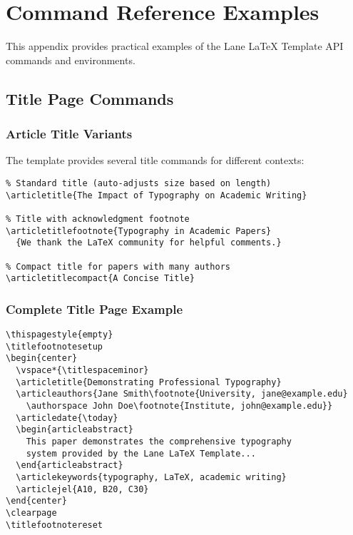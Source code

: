 
\section{Command Reference Examples}
\label{app:api-examples}

This appendix provides practical examples of the Lane LaTeX Template API commands and environments.

\subsection{Title Page Commands}

\subsubsection{Article Title Variants}

The template provides several title commands for different contexts:

\begin{verbatim}
% Standard title (auto-adjusts size based on length)
\articletitle{The Impact of Typography on Academic Writing}

% Title with acknowledgment footnote
\articletitlefootnote{Typography in Academic Papers}
  {We thank the LaTeX community for helpful comments.}

% Compact title for papers with many authors
\articletitlecompact{A Concise Title}
\end{verbatim}

\subsubsection{Complete Title Page Example}

\begin{verbatim}
\thispagestyle{empty}
\titlefootnotesetup
\begin{center}
  \vspace*{\titlespaceminor}
  \articletitle{Demonstrating Professional Typography}
  \articleauthors{Jane Smith\footnote{University, jane@example.edu}
    \authorspace John Doe\footnote{Institute, john@example.edu}}
  \articledate{\today}
  \begin{articleabstract}
    This paper demonstrates the comprehensive typography 
    system provided by the Lane LaTeX Template...
  \end{articleabstract}
  \articlekeywords{typography, LaTeX, academic writing}
  \articlejel{A10, B20, C30}
\end{center}
\clearpage
\titlefootnotereset
\end{verbatim}

